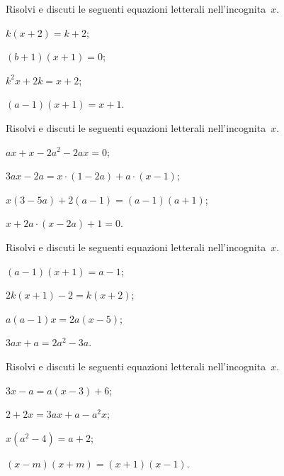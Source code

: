 \begin{esercizio}[\Ast]
\label{ese:17.39}
Risolvi e discuti le seguenti equazioni letterali nell'incognita~$x$.
\begin{multicols}{2}
\begin{enumeratea}
 \item $k(x+2)=k+2$;
 \item $(b+1)(x+1)=0$;
 \item $k^{2}x+2k=x+2$;
 \item $(a-1)(x+1)=x+1$.
\end{enumeratea}
\end{multicols}
\end{esercizio}

\begin{esercizio}
\label{ese:17.40}
Risolvi e discuti le seguenti equazioni letterali nell'incognita~$x$.
\begin{multicols}{2}
\begin{enumeratea}
 \item $ax+x-2a^{2}-2ax=0$;
 \item $3ax-2a=x\cdot (1-2a)+a\cdot (x-1)$;
 \item $x (3-5a)+2 (a-1)=(a-1) (a+1)$;
 \item $x+2a\cdot (x-2a)+1=0$.
\end{enumeratea}
\end{multicols}
\end{esercizio}

\begin{esercizio}[\Ast]
\label{ese:17.41}
Risolvi e discuti le seguenti equazioni letterali nell'incognita~$x$.
\begin{multicols}{2}
\begin{enumeratea}
 \item $(a-1)(x+1)=a-1$;
 \item $2k(x+1)-2=k(x+2)$;
 \item $a(a-1)x=2a(x-5)$;
 \item $3ax+a=2a^{2}-3a$.
\end{enumeratea}
\end{multicols}
\end{esercizio}

\begin{esercizio}[\Ast]
\label{ese:17.42}
Risolvi e discuti le seguenti equazioni letterali nell'incognita~$x$.
\begin{multicols}{2}
\begin{enumeratea}
 \item $3x-a=a(x-3)+6$;
 \item $2+2x=3ax+a-a^{2}x$;
 \item $x(a^{2}-4)=a+2$;
 \item $(x-m)(x+m)=(x+1)(x-1)$.
\end{enumeratea}
\end{multicols}
\end{esercizio}


